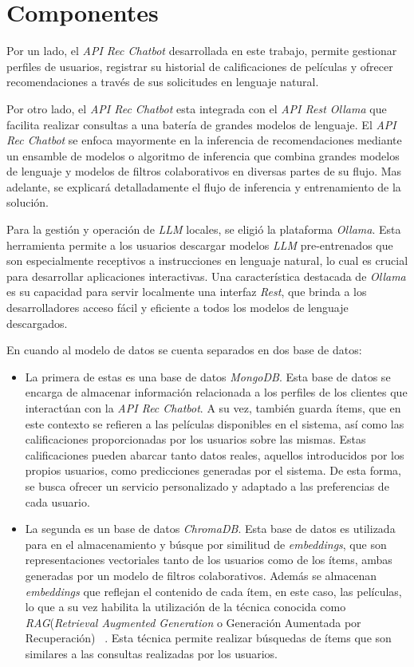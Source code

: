 \documentclass[11pt,a4paper,twoside]{thesis}
\begin{document}
\vfill
\section{Componentes}

Por un lado, el \textit{API Rec Chatbot} desarrollada en este trabajo, permite gestionar perfiles de usuarios, registrar su historial de calificaciones de películas y ofrecer recomendaciones a través de sus solicitudes en lenguaje natural.

Por otro lado, el \textit{API Rec Chatbot} esta integrada con el \textit{API Rest Ollama} que facilita realizar consultas a una batería de grandes modelos de lenguaje. El \textit{API Rec Chatbot} se enfoca mayormente en la inferencia de recomendaciones mediante un ensamble de modelos o algoritmo de inferencia que combina grandes modelos de lenguaje y modelos de filtros colaborativos en diversas partes de su flujo. Mas adelante, se explicará detalladamente el flujo de inferencia y entrenamiento de la solución.

Para la gestión y operación de \textit{LLM} locales, se eligió la plataforma \textit{Ollama}. Esta herramienta permite a los usuarios descargar modelos \textit{LLM} pre-entrenados que son especialmente receptivos a instrucciones en lenguaje natural, lo cual es crucial para desarrollar aplicaciones interactivas. Una característica destacada de \textit{Ollama} es su capacidad para servir localmente una interfaz \textit{Rest}, que brinda a los desarrolladores acceso fácil y eficiente a todos los modelos de lenguaje descargados.

En cuando al modelo de datos se cuenta separados en dos base de datos:
\begin{itemize}
	\item La primera de estas es una base de datos \textit{MongoDB}. Esta base de datos se encarga de almacenar información relacionada a los perfiles de los clientes que interactúan con la \textit{API Rec Chatbot}. A su vez, también guarda ítems, que en este contexto se refieren a las películas disponibles en el sistema, así como las calificaciones proporcionadas por los usuarios sobre las mismas. Estas calificaciones pueden abarcar tanto datos reales, aquellos introducidos por los propios usuarios, como predicciones generadas por el sistema. De esta forma, se busca ofrecer un servicio personalizado y adaptado a las preferencias de cada usuario.

	\item La segunda es un base de datos \textit{ChromaDB}. Esta base de datos es utilizada para en el almacenamiento y búsque por similitud de \textit{embeddings}, que son representaciones vectoriales tanto de los usuarios como de los ítems, ambas generadas por un modelo de filtros colaborativos. Además se almacenan \textit{embeddings} que reflejan el contenido de cada ítem, en este caso, las películas, lo que a su vez habilita la utilización de la técnica conocida como \textit{RAG}(\textit{Retrieval Augmented Generation} o Generación Aumentada por Recuperación) ~\cite{rag}. Esta técnica permite realizar búsquedas de ítems que son similares a las consultas realizadas por los usuarios.
\end{itemize}
\end{document}
